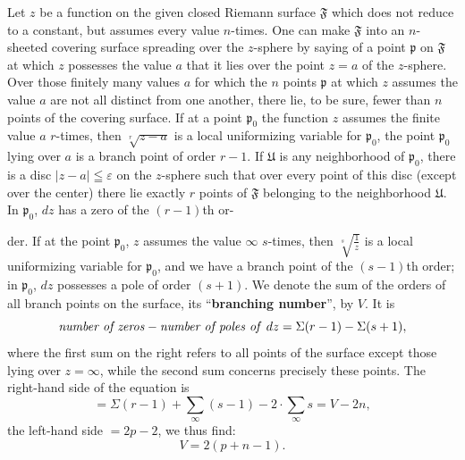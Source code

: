 \documentclass{article}
\begin{document}
Let $z$ be a function on the given closed Riemann surface $\mathfrak{F}$ which does not reduce to a constant, but assumes every value $n$-times. One can make $\mathfrak{F}$ into an $n$-sheeted covering surface spreading over the $z$-sphere by saying of a point $\mathfrak{p}$ on $\mathfrak{F}$ at which $z$ possesses the value $a$ that it lies over the point $z = a$ of the $z$-sphere. Over those finitely many values $a$ for which the $n$ points $\mathfrak{p}$ at which $z$ assumes the value $a$ are not all distinct from one another, there lie, to be sure, fewer than $n$ points of the covering surface. If at a point $\mathfrak{p}_0$ the function $z$ assumes the finite value $a$ $r$-times, then $\sqrt[r]{z - a}$ is a local uniformizing variable for $\mathfrak{p}_0$, the point $\mathfrak{p}_0$ lying over $a$ is a branch point of order $r - 1$. If $\mathfrak{U}$ is any neighborhood of $\mathfrak{p}_0$, there is a disc $|z - a| \leqq \varepsilon$ on the $z$-sphere such that over every point of this disc (except over the center) there lie exactly $r$ points of $\mathfrak{F}$ belonging to the neighborhood $\mathfrak{U}$. In $\mathfrak{p}_0$, $dz$ has a zero of the $(r - 1)$th or-

der. If at the point $\mathfrak{p}_0$, $z$ assumes the value $\infty$ $s$-times, then $\sqrt[s]{\frac{1}{z}}$ is a local uniformizing variable for $\mathfrak{p}_0$, and we have a branch point of the $(s - 1)$th order; in $\mathfrak{p}_0$, $dz$ possesses a pole of order $(s + 1)$. We denote the sum of the orders of all branch points on the surface, its ``\textbf{branching number}'', by $V$. It is
\[ \text{\emph{number of zeros}} - \text{\emph{number of poles of }} dz = \Sigma(r - 1) - \Sigma(s + 1), \]
where the first sum on the right refers to all points of the surface except those lying over $z = \infty$, while the second sum concerns precisely these points. The right-hand side of the equation is
\[ = \Sigma(r - 1) + \sum_\infty (s - 1) - 2 \cdot \sum_\infty s = V - 2n, \]
the left-hand side $= 2p - 2$, we thus find:
\[ V = 2(p + n - 1). \]
\end{document}
